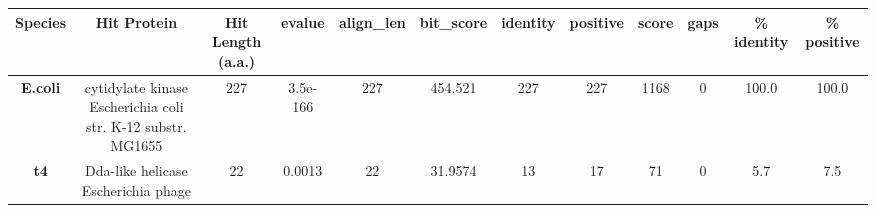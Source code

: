 \begin{tabular}{|c|c|c|c|c|c|c|c|c|c|c|c|} \hline
\textbf{Species} & \textbf{Hit Protein} & \textbf{Hit Length (a.a.)} & \textbf{evalue} & \textbf{align\_len} & \textbf{bit\_score} & \textbf{identity} & \textbf{positive} & \textbf{score} & \textbf{gaps} & \textbf{\% identity} & \textbf{\% positive} \\ \hline
\textbf{E.coli} & cytidylate kinase Escherichia coli str. K-12 substr. MG1655 & 227 & 3.5e-166 & 227 & 454.521 & 227 & 227 & 1168 & 0 & 100.0 & 100.0\\
\textbf{t4} & Dda-like helicase Escherichia phage  & 22 & 0.0013 & 22 & 31.9574 & 13 & 17 & 71 & 0 & 5.7 & 7.5\\
\hline \end{tabular}
